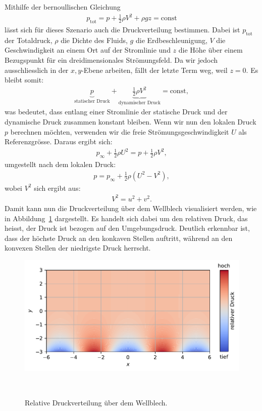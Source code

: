 Mithilfe der bernoullischen Gleichung~\cite{BernoulliWikiDE}
\begin{align*}
    p_{\text{tot}} 
    = 
    p 
    + 
    \frac{1}{2} \rho V^2 
    + 
    \rho g z 
    = \text{const}
\end{align*}
lässt sich für dieses Szenario auch die Druckverteilung bestimmen.
Dabei ist $p_{\text{tot}}$ der Totaldruck, 
$\rho$ die Dichte des Fluids, $g$ die Erdbeschleunigung,
$V$ die Geschwindigkeit an einem Ort auf der Stromlinie 
und $z$ die Höhe über einem Bezugspunkt 
für ein dreidimensionales Strömungsfeld.
Da wir jedoch ausschliesslich in der $x,y$-Ebene arbeiten, 
fällt der letzte Term weg, weil $z = 0$.
Es bleibt somit:
\begin{align*}
    \underbrace{p}_{\text{statischer Druck}} 
    + 
    \underbrace{\frac{1}{2} \rho V^2}_{\text{dynamischer Druck}} 
    = 
    \text{const},
\end{align*}
was bedeutet, dass entlang einer Stromlinie 
der statische Druck und der dynamische Druck
zusammen konstant bleiben.
Wenn wir nun den lokalen Druck $p$ berechnen möchten, 
verwenden wir die freie Strömungsgeschwindigkeit $U$
als Referenzgrösse. 
Daraus ergibt sich:
\begin{align*}
    p_\infty 
    + 
    \frac{1}{2} \rho U^2 
    = 
    p 
    + 
    \frac{1}{2} \rho V^2,
\end{align*}
umgestellt nach dem lokalen Druck:
\begin{align*}
    p = p_\infty + \frac{1}{2} \rho (U^2 - V^2),
\end{align*}
wobei $V^2$ sich ergibt aus:
\begin{align*}
    V^2 = u^2 + v^2.
\end{align*}
Damit kann nun die Druckverteilung über dem Wellblech visualisiert werden, 
wie in Abbildung~\ref{fig:druckverteilung} dargestellt. 
Es handelt sich dabei um den relativen Druck, 
das heisst, der Druck ist bezogen auf den Umgebungsdruck. 
Deutlich erkennbar ist, dass der höchste Druck an den konkaven Stellen auftritt, 
während an den konvexen Stellen der niedrigste Druck herrscht.
\begin{figure}
    \centering
    \includegraphics[width=\textwidth]{papers/ueberschall/figures/Druckverteilung.pdf}
    \caption{Relative Druckverteilung über dem Wellblech.}
    ~\label{fig:druckverteilung}  
\end{figure}

